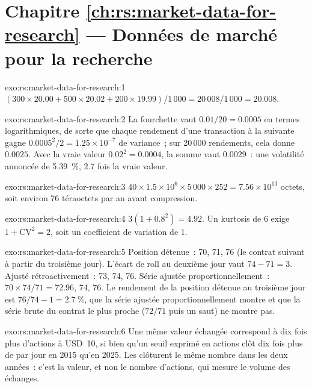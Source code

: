 \section*{Chapitre \ref{ch:rs:market-data-for-research} --- Données de marché pour la recherche}

\begin{solution}{exo:rs:market-data-for-research:1}
$(300 \times 20.00 + 500 \times 20.02 + 200 \times 19.99)/1\,000 = 20\,008/1\,000 = 20.008$.
\end{solution}

\begin{solution}{exo:rs:market-data-for-research:2}
La fourchette vaut $0.01/20 = 0.0005$ en termes logarithmiques, de sorte que chaque rendement d'une transaction à la suivante gagne $0.0005^2/2 = 1.25 \times 10^{-7}$ de variance~;
sur 20\,000 rendements, cela donne $0.0025$. Avec la vraie valeur $0.02^2 = 0.0004$, la somme vaut $0.0029$~: une volatilité annoncée de 5.39~\%, 2.7
fois la vraie valeur.
\end{solution}

\begin{solution}{exo:rs:market-data-for-research:3}
$40 \times 1.5 \times 10^6 \times 5\,000 \times 252 = 7.56 \times 10^{13}$ octets, soit environ 76 téraoctets par an avant compression.
\end{solution}

\begin{solution}{exo:rs:market-data-for-research:4}
$3(1 + 0.8^2) = 4.92$. Un kurtosis de 6 exige $1 + \mathrm{CV}^2 = 2$, soit un coefficient de variation de 1.
\end{solution}

\begin{solution}{exo:rs:market-data-for-research:5}
Position détenue~: 70, 71, 76 (le contrat suivant à partir du troisième jour). L'écart de roll au deuxième jour vaut $74 - 71 = 3$. Ajusté rétroactivement~: 73, 74, 76.
Série ajustée proportionnellement~: $70 \times 74/71 = 72.96$, $74$, $76$. Le rendement de la position détenue au troisième jour est $76/74 - 1 = 2.7~\%$, que la
série ajustée proportionnellement montre et que la série brute du contrat le plus proche ($72/71$ puis un saut) ne montre pas.
\end{solution}

\begin{solution}{exo:rs:market-data-for-research:6}
Une même valeur échangée correspond à dix fois plus d'actions à USD~10, si bien qu'un seuil exprimé en actions clôt dix fois plus de  par jour en
2015 qu'en 2025. Les  clôturent le même nombre dans les deux années~: c'est la valeur, et non le nombre d'actions, qui mesure le volume des échanges.
\end{solution}

